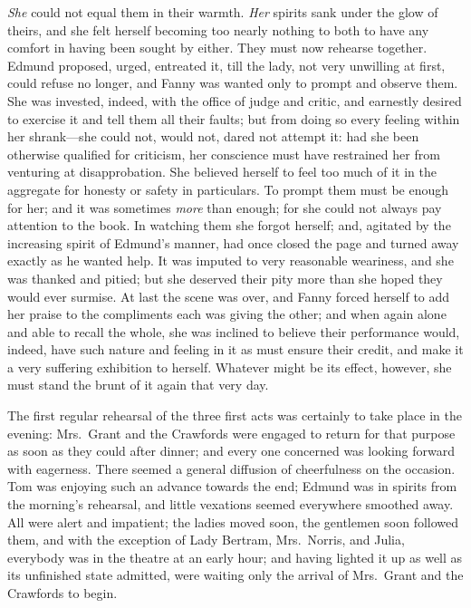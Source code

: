 \documentclass{article}
\begin{document}
\emph{She} could not equal them in their warmth.  \emph{Her} spirits
sank under the glow of theirs, and she felt herself becoming
too nearly nothing to both to have any comfort in having
been sought by either.  They must now rehearse together.
Edmund proposed, urged, entreated it, till the lady,
not very unwilling at first, could refuse no longer,
and Fanny was wanted only to prompt and observe them.
She was invested, indeed, with the office of judge and critic,
and earnestly desired to exercise it and tell them all
their faults; but from doing so every feeling within
her shrank---she could not, would not, dared not attempt it:
had she been otherwise qualified for criticism, her conscience
must have restrained her from venturing at disapprobation.
She believed herself to feel too much of it in the aggregate
for honesty or safety in particulars.  To prompt them must
be enough for her; and it was sometimes \emph{more} than enough;
for she could not always pay attention to the book.
In watching them she forgot herself; and, agitated by the
increasing spirit of Edmund's manner, had once closed
the page and turned away exactly as he wanted help.
It was imputed to very reasonable weariness, and she was
thanked and pitied; but she deserved their pity more than
she hoped they would ever surmise.  At last the scene
was over, and Fanny forced herself to add her praise to
the compliments each was giving the other; and when again
alone and able to recall the whole, she was inclined
to believe their performance would, indeed, have such
nature and feeling in it as must ensure their credit,
and make it a very suffering exhibition to herself.
Whatever might be its effect, however, she must stand
the brunt of it again that very day.

The first regular rehearsal of the three first acts
was certainly to take place in the evening:  Mrs.\ Grant
and the Crawfords were engaged to return for that purpose
as soon as they could after dinner; and every one concerned
was looking forward with eagerness.  There seemed
a general diffusion of cheerfulness on the occasion.
Tom was enjoying such an advance towards the end;
Edmund was in spirits from the morning's rehearsal,
and little vexations seemed everywhere smoothed away.
All were alert and impatient; the ladies moved soon,
the gentlemen soon followed them, and with the exception
of Lady Bertram, Mrs.\ Norris, and Julia, everybody was
in the theatre at an early hour; and having lighted it up
as well as its unfinished state admitted, were waiting only
the arrival of Mrs.\ Grant and the Crawfords to begin.
\end{document}
